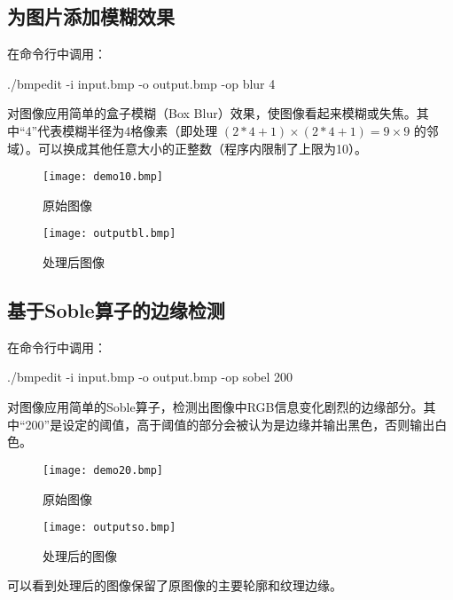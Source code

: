 \documentclass[11pt]{article}
\begin{document}
\subsection{为图片添加模糊效果}
在命令行中调用：
\begin{commandline}
./bmpedit -i input.bmp -o output.bmp -op blur 4
\end{commandline}
对图像应用简单的盒子模糊（Box Blur）效果，使图像看起来模糊或失焦。其中“4”代表模糊半径为4格像素（即处理 $(2*4+1) \times (2*4+1) = 9 \times 9$ 的邻域）。可以换成其他任意大小的正整数（程序内限制了上限为10）。

\begin{figure}[H]
  \centering
  \texttt{[image: demo10.bmp]}
  \caption{原始图像}
  \label{fig:example}
\end{figure}

\begin{figure}[H]
  \centering
  \texttt{[image: outputbl.bmp]}
  \caption{处理后图像}
  \label{fig:example}
\end{figure}

\subsection{基于Soble算子的边缘检测}
在命令行中调用：
\begin{commandline}
./bmpedit -i input.bmp -o output.bmp -op sobel 200
\end{commandline}
对图像应用简单的Soble算子，检测出图像中RGB信息变化剧烈的边缘部分。其中“200”是设定的阈值，高于阈值的部分会被认为是边缘并输出黑色，否则输出白色。

\begin{figure}[H]
  \centering
  \begin{minipage}[b]{0.45\textwidth}
    \centering
    \texttt{[image: demo20.bmp]}
   \caption{原始图像}
    \label{fig:image1}
  \end{minipage}
  \hfill %
  \begin{minipage}[b]{0.45\textwidth}
    \centering
    \texttt{[image: outputso.bmp]}
  \caption{处理后的图像}
    \label{fig:image2}
  \end{minipage}
\end{figure}
可以看到处理后的图像保留了原图像的主要轮廓和纹理边缘。
\end{document}
